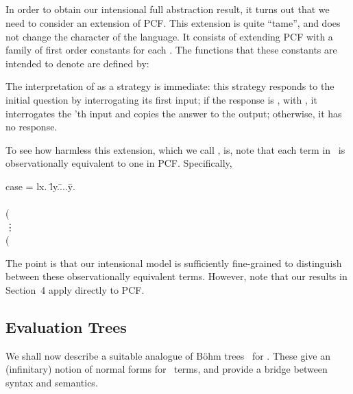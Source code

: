 \documentclass[11pt]{article}
\newcommand{\pcfc}{\mbox{}}
\begin{document}
\subsection{\pcfc}

In order to obtain our intensional full abstraction result, it turns out
that we need to consider an extension of PCF. This extension is quite
``tame'', and does not change the character of the language. It consists
of extending PCF with a family of first order constants
 for each .  The
functions that these constants are intended to denote are defined by:

The interpretation of  as a strategy is immediate:
this strategy responds to the initial question by interrogating its
first input; if the response is , with , it
interrogates the 'th input and copies the answer to the output;
otherwise, it has no response.

To see how harmless this extension, which we call \pcfc, is, note that
each term in \pcfc\  is observationally equivalent to one in PCF.
Specifically,

\begin{tabbing}
case =  lx. \=ly.\= ...\= y. \kill
 \\
\>  \\
\> \> (\\
\>\>\> \vdots \\
\>\>\> (\\
\end{tabbing}
The point is that our intensional model is sufficiently fine-grained
to distinguish between these observationally equivalent terms.
However, note that our results in Section~4 apply directly to PCF.



\subsection{Evaluation Trees}

We shall now describe a suitable analogue of B\"{o}hm
trees~\cite{BarendregtHP:lamcss}
for \pcfc.  These give an (infinitary) notion of normal forms for
\pcfc\ terms, and provide a bridge between syntax and semantics.
\end{document}
